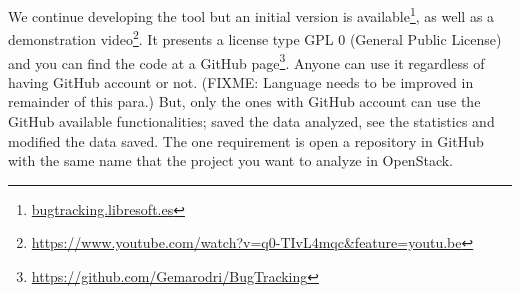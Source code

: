 \documentclass[ifip]{svmult}
\begin{document}
We continue developing the tool but an initial version is available\footnote{\url{bugtracking.libresoft.es}}, as well as a demonstration video\footnote{\url{https://www.youtube.com/watch?v=q0-TIvL4mqc&feature=youtu.be}}. It presents a license type GPL 0 (General Public License) and you can find the code at a GitHub page\footnote{\url{https://github.com/Gemarodri/BugTracking}}. Anyone can use it regardless of having GitHub account or not. (FIXME: Language needs to be improved in remainder of this para.) But, only the ones with GitHub account can use the GitHub available functionalities; saved the data analyzed, see the statistics and modified the data saved. The one requirement is open a repository in GitHub with the same name that the project you want to analyze in OpenStack.




\end{document}

